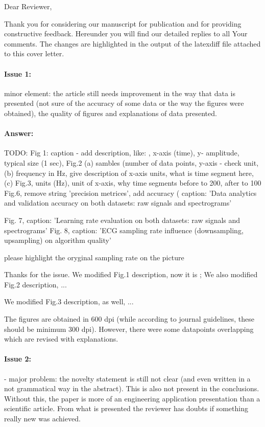 \documentclass{article}
\begin{document}
Dear Reviewer,

\vspace{0.25in}

Thank you for considering our manuscript for publication and for providing constructive feedback.
Hereunder you will find our detailed replies to all Your comments.
The changes are highlighted in the output of the latexdiff file attached to this cover letter.

\paragraph{Issue 1:}
\begin{displayquote}
minor element: the article still needs improvement in the way that data is presented (not sure of the accuracy of some data or the way the figures were obtained), the quality of figures and explanations of data presented.
\end{displayquote}

\paragraph{Answer:}
TODO:
Fig 1: caption - add description, like: , x-axis (time), y- amplitude, typical size (1 sec),
Fig.2 (a) sambles (number of data points, y-axis - check unit, (b) frequency in Hz, give description of x-axis units, what is time segment here, (c)
Fig.3,  units (Hz), unit of x-axis, why time segments before to 200, after to 100
Fig.6, remove string 'precision metrices', add accuracy (%
caption: 'Data analytics and validation accuracy on both datasets: raw signals and spectrograms'

Fig. 7, caption: 'Learning rate evaluation on both datasets: raw signals and spectrograms'
Fig. 8, caption: 'ECG sampling rate influence (downsampling, upsampling) on algorithm quality'

please highlight the oryginal sampling rate on the picture



Thanks for the issue.
We modified Fig.1 description, now it is ;
We also modified Fig.2 description, ...

We modified Fig.3 description, as well, ...

The figures are obtained in 600 dpi (while according to journal guidelines, these should be minimum 300 dpi). However, there were some datapoints overlapping which are revised with explanations. 


\paragraph{Issue 2:}
\begin{displayquote}
- major problem: the novelty statement is still not clear (and even written in a not grammatical way in the abstract). This is also not present in the conclusions. Without this, the paper is more of an engineering application presentation than a scientific article. From what is presented the reviewer has doubts if something really new was achieved.
\end{displayquote}
\end{document}
